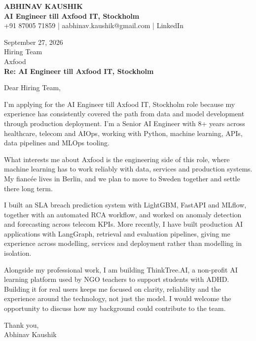 \documentclass[10pt,a4paper]{article}
\begin{document}
\begin{center}
{\Large\bfseries ABHINAV KAUSHIK}\\[2pt]
{\bfseries AI Engineer till Axfood IT, Stockholm}\\[2pt]
+91 87005 71859 \quad | \quad aabhinav.kaushik@gmail.com \quad | \quad LinkedIn
\end{center}
\vspace{8pt}
September 27, 2026\\[6pt]
Hiring Team\\
Axfood\\[4pt]
\textbf{Re: AI Engineer till Axfood IT, Stockholm}

Dear Hiring Team,

I’m applying for the AI Engineer till Axfood IT, Stockholm role because my experience has consistently covered the path from data and model development through production deployment. I’m a Senior AI Engineer with 8+ years across healthcare, telecom and AIOps, working with Python, machine learning, APIs, data pipelines and MLOps tooling.

What interests me about Axfood is the engineering side of this role, where machine learning has to work reliably with data, services and production systems. My fiancée lives in Berlin, and we plan to move to Sweden together and settle there long term.

I built an SLA breach prediction system with LightGBM, FastAPI and MLflow, together with an automated RCA workflow, and worked on anomaly detection and forecasting across telecom KPIs. More recently, I have built production AI applications with LangGraph, retrieval and evaluation pipelines, giving me experience across modelling, services and deployment rather than modelling in isolation.

Alongside my professional work, I am building ThinkTree.AI, a non-profit AI learning platform used by NGO teachers to support students with ADHD. Building it for real users keeps me focused on clarity, reliability and the experience around the technology, not just the model. I would welcome the opportunity to discuss how my background could contribute to the team.

Thank you,\\
Abhinav Kaushik
\end{document}

